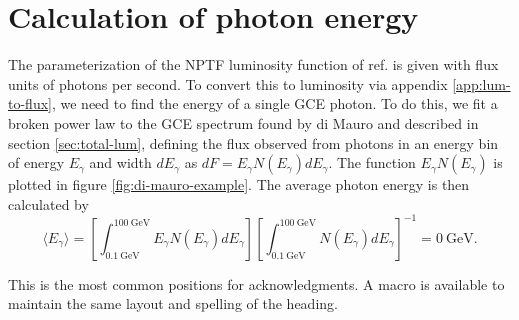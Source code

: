 \documentclass[a4paper,11pt]{article}
\newcommand{\brackets}[1]{\left[#1\right]}
\newcommand{\comment}[1]{\emph{\color{red}{#1}}}
\begin{document}
\section{Calculation of photon energy}
\label{app:photon-energy}
The parameterization of the NPTF luminosity function of ref. \cite{Lee:2015fea} is given with flux units of photons per second. To convert this to luminosity via appendix \ref{app:lum-to-flux}, we need to find the energy of a single GCE photon. To do this, we fit a broken power law to the GCE spectrum found by di Mauro and described in section \ref{sec:total-lum}, defining the flux observed from photons in an energy bin of energy $E_\gamma$ and width $dE_\gamma$ as $dF = E_\gamma N(E_\gamma)dE_\gamma$. The function $E_\gamma N(E_\gamma)$ is plotted in figure \ref{fig:di-mauro-example}. The average photon energy is then calculated by
\begin{equation}
    \langle E_\gamma \rangle =  \brackets{\int_{\SI{0.1}{\giga\electronvolt}}^{\SI{100}{\giga\electronvolt}} E_\gamma N(E_\gamma) dE_\gamma} \brackets{\int_{\SI{0.1}{\giga\electronvolt}}^{\SI{100}{\giga\electronvolt}} N(E_\gamma) dE_\gamma}^{-1} = \SI{0}{\giga\electronvolt}.
    \label{eqn:photon-energy}
\end{equation}
\comment{I'd like to finish this. Give examples of photon energy.}



\acknowledgments

This is the most common positions for acknowledgments. A macro is
available to maintain the same layout and spelling of the heading.










\end{document}
